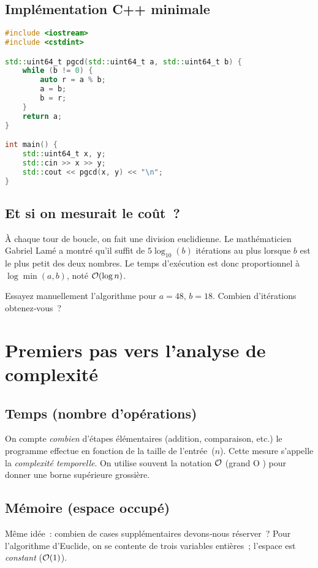 \subsection{Implémentation C++ minimale}
\begin{lstlisting}[language=C++,caption=euclid.cpp]
#include <iostream>
#include <cstdint>

std::uint64_t pgcd(std::uint64_t a, std::uint64_t b) {
    while (b != 0) {
        auto r = a % b;
        a = b;
        b = r;
    }
    return a;
}

int main() {
    std::uint64_t x, y;
    std::cin >> x >> y;
    std::cout << pgcd(x, y) << "\n";
}
\end{lstlisting}

\subsection{Et si on mesurait le coût ?}
À chaque tour de boucle, on fait une division euclidienne. Le mathématicien
Gabriel Lamé a montré qu’il suffit de \(5\log_{10}(b)\) itérations au plus
lorsque \(b\) est le plus petit des deux nombres. Le temps d’exécution est donc
proportionnel à \(\log \min(a, b)\), noté $\mathcal{O}(\log n)$.

\begin{reflexion}
Essayez manuellement l’algorithme pour \(a = 48,\, b = 18\). Combien
d’itérations obtenez‑vous ?
\end{reflexion}

\section{Premiers pas vers l’analyse de complexité}

\subsection{Temps (nombre d’opérations)}
On compte \emph{combien} d’étapes élémentaires (addition, comparaison, etc.)
le programme effectue en fonction de la taille de l’entrée (\(n\)). Cette mesure
s’appelle la \emph{complexité temporelle}. On utilise souvent la notation
$\mathcal{O}$ (\og grand O \fg) pour donner une borne supérieure grossière.

\subsection{Mémoire (espace occupé)}
Même idée : combien de cases supplémentaires devons‑nous réserver ? Pour
l’algorithme d’Euclide, on se contente de trois variables entières ; l’espace est
\emph{constant} ($\mathcal{O}(1)$).


